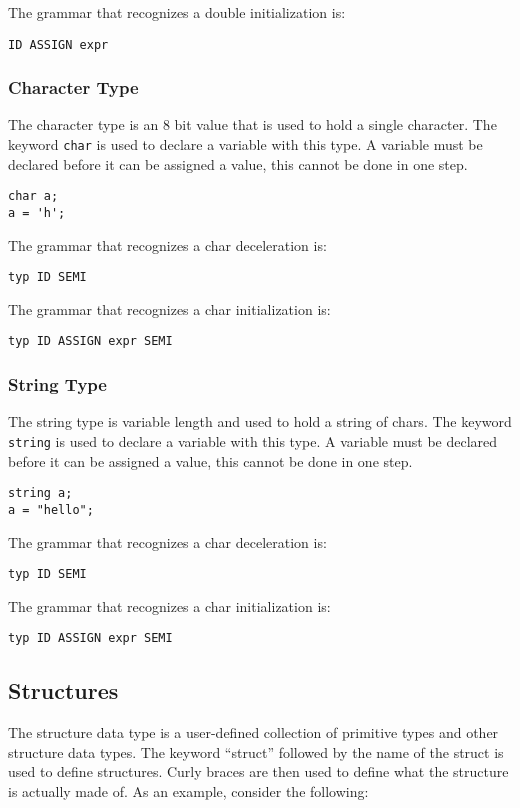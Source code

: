 \documentclass{article}
\begin{document}
The grammar that recognizes a double initialization is: 
\begin{Verbatim}[frame=single]
ID ASSIGN expr
\end{Verbatim}

\subsubsection{Character Type}
The character type is an 8 bit value that is used to hold a single character. The keyword \texttt{char} is used to declare a variable with this type.  A variable must be declared before it can be assigned a value, this cannot be done in one step.
\begin{lstlisting}
char a;
a = 'h';
\end{lstlisting}

The grammar that recognizes a char deceleration is: 
\begin{Verbatim}[frame=single]
typ ID SEMI
\end{Verbatim}

The grammar that recognizes a char initialization is: 
\begin{Verbatim}[frame=single]
typ ID ASSIGN expr SEMI
\end{Verbatim}

\subsubsection{String Type}
The string type is variable length and used to hold a string of chars.  The keyword \texttt{string} is used to declare a variable with this type.  A variable must be declared before it can be assigned a value, this cannot be done in one step.
\begin{lstlisting}
string a;
a = "hello";
\end{lstlisting}

The grammar that recognizes a char deceleration is: 
\begin{Verbatim}[frame=single]
typ ID SEMI
\end{Verbatim}

The grammar that recognizes a char initialization is: 
\begin{Verbatim}[frame=single]
typ ID ASSIGN expr SEMI
\end{Verbatim}

\subsection{Structures}
The structure data type is a user-defined collection of primitive types and other structure data types. The keyword ``struct'' followed by the name of the struct is used to define structures. Curly braces are then used to define what the structure is actually made of. As an example, consider the following:
\end{document}
